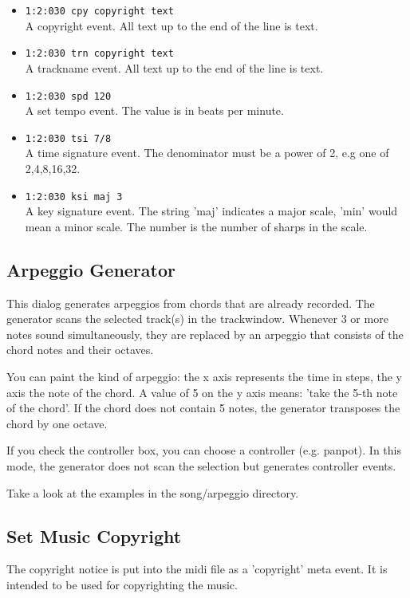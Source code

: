 \documentclass[letterpaper]{report}
\begin{document}
\begin{itemize}
\item {\tt 1:2:030 cpy copyright text}\\
        A copyright event. All text up to the end of the line is text.

\item {\tt 1:2:030 trn copyright text}\\
        A trackname event. All text up to the end of the line is text.

\item {\tt 1:2:030 spd 120}\\
        A set tempo event. The value is in beats per minute.

\item {\tt 1:2:030 tsi 7/8}\\
        A time signature event. The denominator must be a power of 2, e.g one
        of 2,4,8,16,32.

\item {\tt 1:2:030 ksi maj 3}\\
        A key signature event. The string 'maj' indicates a major scale,
        'min' would mean a minor scale. The number is the number of
        sharps in the scale.

\end{itemize}



\subsection{Arpeggio Generator}\label{arpeg}

This dialog generates arpeggios from chords that are already recorded.
The generator scans the selected track(s) in the trackwindow. Whenever
3 or more notes sound simultaneously, they are replaced by an arpeggio that
consists of the chord notes and their octaves.

You can paint the kind of arpeggio: the x axis represents the time in steps,
the y axis the note of the chord. A value of 5 on the y axis means: 'take
the 5-th note of the chord'. If the chord does not contain 5 notes, the
generator transposes the chord by one octave.

If you check the controller box, you can choose a controller (e.g. panpot).
In this mode, the generator does not scan the selection but generates controller
events.

Take a look at the examples in the song/arpeggio directory.


\subsection{Set Music Copyright}\label{muscopyr}
The copyright notice is put into the midi file as a 'copyright' meta event.
It is intended to be used for copyrighting the music.
\end{document}
